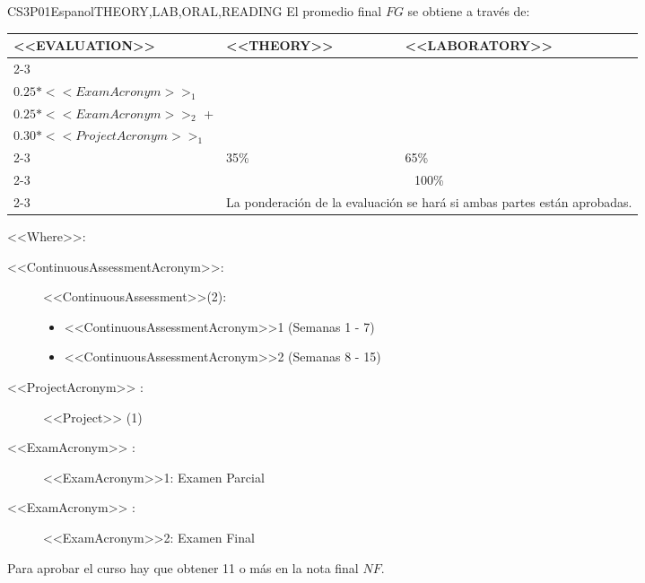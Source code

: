     \begin{evaluation}{CS3P01}{Espanol}{THEORY,LAB,ORAL,READING}
    El promedio final $FG$ se obtiene a través de:

    \begin{tabularx}{0.9\textwidth}{|X|p{}|p{}|} \hline
    \multirow{4}{*}{\uppercase{<<Evaluation>>}} & \uppercase{<<Theory>>} & \uppercase{<<Laboratory>>} \\ \cline{2-3}
    & %
        \begin{minipage}{0.95\textwidth}
        \begin{tabular}{l}
          $0.10*<<ContinuousAssessmentAcronym>>_{1}$  + \\
          $0.25*<<ExamAcronym>>_{1}$ 
        \end{tabular} 
        \end{minipage} 
    & %
        \begin{minipage}{0.95\textwidth}
        \begin{tabular}{l}
          $0.10*<<ContinuousAssessmentAcronym>>_{2}$  + \\
          $0.25*<<ExamAcronym>>_{2}$  +  \\
          $0.30*<<ProjectAcronym>>_{1}$
        \end{tabular} 
        \end{minipage}                 \\ \cline{2-3}
    
    & %
    35\% 
    & %
    65\% \\ \cline{2-3}
    & \multicolumn{2}{|c|}{100\%}  \\ \cline{2-3}
    & \multicolumn{2}{|c|}{La ponderación de la evaluación se hará si ambas partes están aprobadas.}  \\ \hline
    \end{tabularx}
      
    \vspace{2mm}
    \noindent <<Where>>:
    \begin{description}
        \item[<<ContinuousAssessmentAcronym>>:]<<ContinuousAssessment>>(2):
        \begin{itemize}
                \item <<ContinuousAssessmentAcronym>>1 (Semanas 1 - 7) 
                \item <<ContinuousAssessmentAcronym>>2 (Semanas 8 - 15)
        \end{itemize}
        \item[<<ProjectAcronym>> :] <<Project>> (1)
        \item[<<ExamAcronym>> :] <<ExamAcronym>>1: Examen Parcial
        \item[<<ExamAcronym>> :] <<ExamAcronym>>2: Examen Final
    \end{description}

    \noindent Para aprobar el curso hay que obtener 11 o más en la nota final $NF$.
    \end{evaluation}
   
